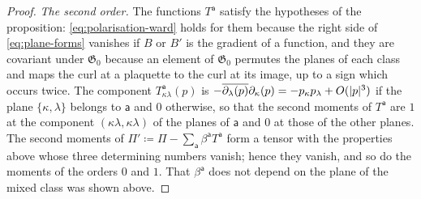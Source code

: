 \documentclass[11pt]{preprint}
\DeclarePairedDelimiter{\abs}{\lvert}{\rvert}
\numberwithin{equation}{section}
\theoremstyle{definition}
\theoremstyle{remark}
\theoremstyle{plain}
\begin{document}
\begin{proof}
\emph{The second order.} The functions $T^{\mathsf a}$ satisfy the hypotheses of the proposition: \eqref{eq:polarisation-ward} holds for them because the right side of \eqref{eq:plane-forms} vanishes if $B$ or $B'$ is the gradient of a function, and they are covariant under $\mathfrak G_0$ because an element of $\mathfrak G_0$ permutes the planes of each class and maps the curl at a plaquette to the curl at its image, up to a sign which occurs twice. The component $T^{\mathsf a}_{\kappa\lambda}(p)$ is $-\overline{\partial_\lambda(p)}\partial_\kappa(p) = -p_\kappa p_\lambda + O(\abs p^3)$ if the plane $\{ \kappa, \lambda \}$ belongs to $\mathsf a$ and $0$ otherwise, so that the second moments of $T^{\mathsf a}$ are $1$ at the component $(\kappa\lambda, \kappa\lambda)$ of the planes of $\mathsf a$ and $0$ at those of the other planes. The second moments of $\Pi' \coloneqq \Pi - \sum_{\mathsf a}\beta^{\mathsf a}T^{\mathsf a}$ form a tensor with the properties above whose three determining numbers vanish; hence they vanish, and so do the moments of the orders $0$ and $1$. That $\beta^{\mathsf a}$ does not depend on the plane of the mixed class was shown above.


\end{proof}
\end{document}
